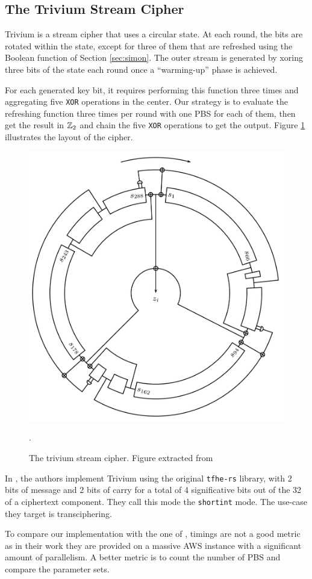 \subsection{The Trivium Stream Cipher}
\label{sec:trivium}

Trivium \cite{ISC:DeCanniere06} is a stream cipher that uses a circular state. At each round, the bits are rotated within the state, except for three of them that are refreshed using the Boolean function of Section \ref{sec:simon}. The outer stream is generated by xoring three bits of the state each round once a ``warming-up'' phase is achieved. 


For each generated key bit, it requires performing this function three times and aggregating five \texttt{XOR} operations in the center. Our strategy is to evaluate the refreshing function three times per round with one \gls{PBS} for each of them, then get the result in $\mathbb{Z}_2$ and chain the five \texttt{XOR} operations to get the output.
Figure \ref{fig:triviuml} illustrates the layout of the cipher.
\begin{figure}
    \centering
    \includegraphics[width=0.5\linewidth]{img/to_harmonize/trivium.png}
    \caption{The trivium stream cipher. Figure extracted from \cite{ISC:DeCanniere06}}.
    \label{fig:triviuml}
\end{figure}


In \cite{DBLP:conf/wahc/BalenboisOS23}, the authors implement Trivium using the original \texttt{tfhe-rs} library, with 2 bits of message and 2 bits of carry for a total of 4 significative bits out of the 32 of a ciphertext component. They call this mode the \texttt{shortint} mode. The use-case they target is transciphering.

To compare our implementation with the one of \cite{DBLP:conf/wahc/BalenboisOS23}, timings are not a good metric as in their work they are provided on a massive AWS instance with a significant amount of parallelism. A better metric is to count the number of \gls{PBS} and compare the parameter sets.


